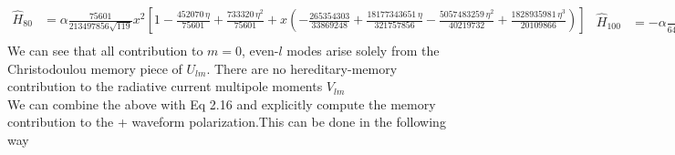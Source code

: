\documentclass[prd,preprintnumbers,twocolumn,eqsecnum,floatfix,letter]{revtex4}
\begin{document}
\begin{widetext}
\begin{subequations}
\begin{align}\label{eq:H80}
	\hat{H}_{80} &=\alpha\frac{75601}{213497856\sqrt{119}}x^2\left[1-\frac{452070\,\eta}{75601} + \frac{733320\,\eta^2}{75601} + x\left(-\frac{265354303}{33869248} + \frac{18177343651\,\eta}{321757856} - \frac{5057483259\,\eta^2}{40219732} + \frac{1828935981\,\eta^3}{20109866}\right)\right]\nonumber\\	
\end{align}
\begin{align}\label{eq:H80}
\hat{H}_{100} &=-\alpha\frac{525221\,x^3}{6452379648\sqrt{154}}\left(1 - \frac{79841784\,\eta}{9979199} + \frac{198570240\,\eta^2}{9979199} -\frac{172307520\,\eta^3}{9979199}\right)
\end{align}
\end{subequations}
We can see that all contribution to $m=0$, even-$l$ modes arise solely from the Christodoulou memory piece of $U_{lm}$. There are no hereditary-memory contribution to the radiative current multipole moments $V_{lm}$\\
We can combine the above with Eq 2.16 and explicitly compute the memory contribution to the + waveform polarization.This can be done in the following way


\end{widetext}
\end{document}
